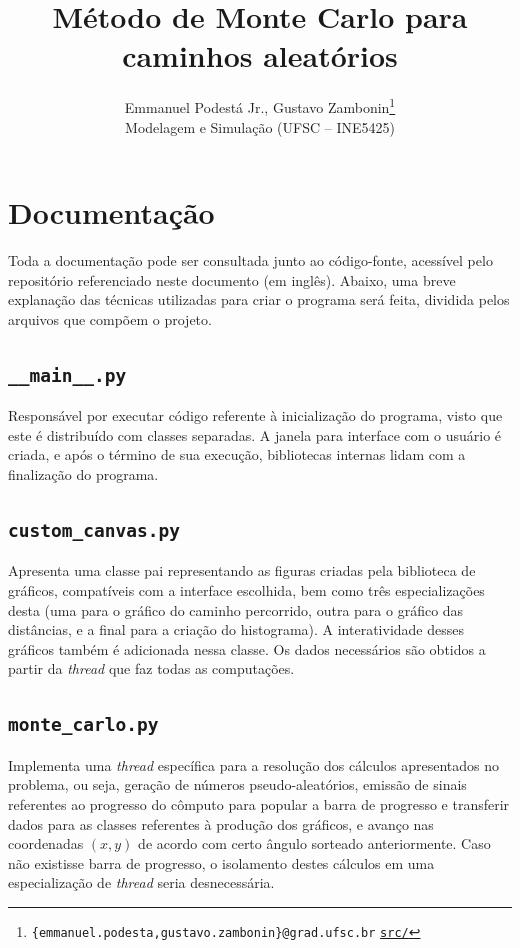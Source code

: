 \documentclass{article}
\title{\textbf{Método de Monte Carlo para caminhos aleatórios}}
\author{Emmanuel Podestá Jr., Gustavo Zambonin\thanks{
        \texttt{\{emmanuel.podesta,gustavo.zambonin\}@grad.ufsc.br} \hfill
        \texttt{\href{https://github.com/zambonin/ufsc-ine5425}{src/}}
    } \\
    \small{Modelagem e Simulação (UFSC -- INE5425)}
}
\date{}
\begin{document}
\maketitle

\section{Documentação}

Toda a documentação pode ser consultada junto ao código-fonte, acessível pelo
repositório referenciado neste documento (em inglês). Abaixo, uma breve
explanação das técnicas utilizadas para criar o programa será feita, dividida
pelos arquivos que compõem o projeto.

\subsection{\texttt{\_\_main\_\_.py}}

Responsável por executar código referente à inicialização do programa, visto
que este é distribuído com classes separadas. A janela para interface com o
usuário é criada, e após o término de sua execução, bibliotecas internas lidam
com a finalização do programa.

\subsection{\texttt{custom\_canvas.py}}

Apresenta uma classe pai representando as figuras criadas pela biblioteca de
gráficos, compatíveis com a interface escolhida, bem como três especializações
desta (uma para o gráfico do caminho percorrido, outra para o gráfico das
distâncias, e a final para a criação do histograma). A interatividade desses
gráficos também é adicionada nessa classe. Os dados necessários são obtidos a
partir da \emph{thread} que faz todas as computações.

\subsection{\texttt{monte\_carlo.py}}

Implementa uma \emph{thread} específica para a resolução dos cálculos
apresentados no problema, ou seja, geração de números pseudo-aleatórios,
emissão de sinais referentes ao progresso do cômputo para popular a barra de
progresso e transferir dados para as classes referentes à produção dos
gráficos, e avanço nas coordenadas $(x, y)$ de acordo com certo ângulo sorteado
anteriormente.  Caso não existisse barra de progresso, o isolamento destes
cálculos em uma especialização de \emph{thread} seria desnecessária.
\end{document}

